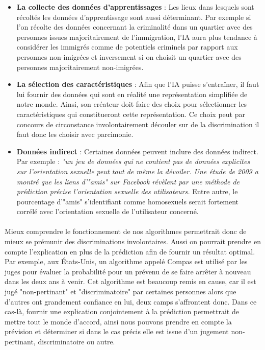 \begin{itemize}
    \item \textbf{La collecte des données d'apprentissages} : Les lieux dans lesquels sont récoltés les données d'apprentissage sont aussi déterminant. Par exemple si l'on récolte des données concernant la criminalité dans un quartier avec des personnes issues majoritairement de l'immigration, l'IA aura plus tendance à considérer les immigrés comme de potentiels criminels par rapport aux personnes non-imigrées et inversement si on choisit un quartier avec des personnes majoritairement non-imigrées.
    \item \textbf{La sélection des caractéristiques} : Afin que l'IA puisse s'entraîner, il faut lui fournir des données qui sont en réalité une représentation simplifiée de notre monde. Ainsi, son créateur doit faire des choix pour sélectionner les caractéristiques qui constitueront cette représentation. Ce choix peut par concours de circonstance involontairement découler sur de la discrimination il faut donc les choisir avec parcimonie.
    \item \textbf{Données indirect} : Certaines données peuvent inclure des données indirect. Par exemple : \textit{"un jeu de données qui ne contient pas de données explicites sur l’orientation sexuelle peut tout de même la dévoiler. Une étude de 2009 a montré que les liens d’"amis" sur Facebook révèlent par une méthode de prédiction précise l’orientation sexuelle des utilisateurs.} Entre autre, le pourcentage d’"amis" s’identifiant comme homosexuels serait fortement corrélé avec l’orientation sexuelle de l’utilisateur concerné\cite{dicriminationAlgo}.
\end{itemize}
\paragraph{}Mieux comprendre le fonctionnement de nos algorithmes permettrait donc de mieux se prémunir des discriminations involontaires. Aussi on pourrait prendre en compte l'explication en plus de la prédiction afin de fournir un résultat optimal. Par exemple, aux États-Unis, un algorithme appelé Compas est utilisé par les juges pour évaluer la probabilité pour un prévenu de se faire arrêter à nouveau dans les deux ans à venir. Cet algorithme est beaucoup remis en cause, car il est jugé "non-pertinant" et "discriminatoire" par certaines personnes alors que d'autres ont grandement confiance en lui, deux camps s'affrontent donc. Dans ce cas-là, fournir une explication conjointement à la prédiction permettrait de mettre tout le monde d'accord, ainsi nous pouvons prendre en compte la prévision et déterminer si dans le cas précis elle est issue d'un jugement non-pertinant, discriminatoire ou autre.

